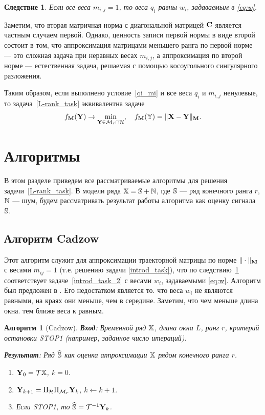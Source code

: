 \documentclass[12pt,a4paper,fleqn,leqno]{article}
\newtheorem{corollary}{Следствие}
\newtheorem{algorithm}{Алгоритм}
\begin{document}
\begin{corollary}
\label{cor:base_weights}
Если все веса $m_{i,j}=1$, то веса $q_i$ равны $w_i$, задаваемым в \eqref{eq:w}.
\end{corollary}

Заметим, что вторая матричная норма с диагональной матрицей $\mathbf{C}$ является частным случаем первой.
Однако, ценность записи первой нормы в виде
второй состоит в том, что аппроксимация матрицами меньшего ранга по первой норме --- это сложная задача при неравных весах
$m_{i,j}$, а аппроксимация по второй норме --- естественная задача, решаемая с помощью косоугольного сингулярного разложения.

\begin{remark}
\label{rem:2tasks}
Таким образом, если выполнено условие~\eqref{qi_mi} и все веса $q_i$ и $m_{i,j}$ ненулевые, то задача~\eqref{L-rank_task}
эквивалентна задаче
\begin{equation*}
\label{rank_task}
    f_{\mathbf{M}}(\mathbf{Y}) \to \min_{\mathbf{Y} \in \mathcal{M}_r \cap \mathcal{H}}, \quad f_{\mathbf{M}}(\mathbb{Y}) = \|\mathbf{X}-\mathbf{Y}\|_{\mathbf{M}}.
\end{equation*}
\end{remark}

\section{Алгоритмы}
\label{sec:alg}
В этом разделе приведем все рассматриваемые алгоритмы для решения задачи~\eqref{L-rank_task}.
В модели ряда $\mathbb{X}=\mathbb{S}+\mathbb{N}$, где $\mathbb{S}$ --- ряд конечного ранга $r$, $\mathbb{N}$ --- шум, будем рассматривать
результат работы алгоритма как оценку сигнала $\mathbb{S}$.

\subsection{Алгоритм Cadzow}
Этот алгоритм служит для аппроксимации траекторной матрицы по норме $\|\cdot\|_{\mathbf{M}}$ с весами $m_{ij}=1$ (т.е. решению задачи \eqref{introd_task}), что по следствию~\ref{cor:base_weights} соответствует задаче~\eqref{introd_task_2} с весами $w_i$, задаваемыми \eqref{eq:w}.
Алгоритм был предложен в \cite{Cadzow1988}. Его недостатком является то. что веса $w_i$ не являются равными,
на краях они меньше, чем в середине. Заметим, что чем меньше длина окна. тем ближе веса к равным.

\begin{algorithm}[Cadzow]
\textbf{Вход}: Временной ряд $\mathbb{X}$, длина окна $L$, ранг $r$,
критерий остановки STOP1 (например, заданное число итераций).

\textbf{Результат}:
Ряд $\widehat{\mathbb{S}}$ как оценка аппроксимации $\mathbb{X}$ рядом конечного ранга $r$.

\begin{enumerate}
\item
$\mathbf{Y}_0 = \mathcal{T} \mathbb{X}$, $k=0$.
\item
$\mathbf{Y}_{k+1} = \Pi_{\mathcal{H}}  \Pi_{\mathcal{M}_r} \mathbf{Y}_{k}$, $k\leftarrow k+1$.
\item
Если STOP1, то $\widehat{\mathbb{S}} = \mathcal{T}^{-1} \mathbf{Y}_k$.
\end{enumerate}
\end{algorithm}
\end{document}
